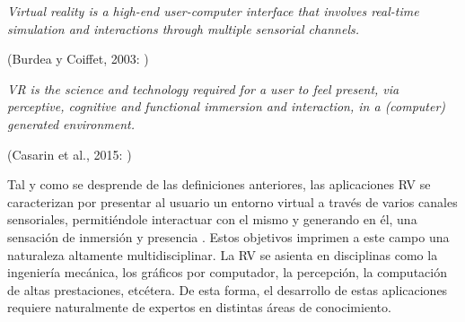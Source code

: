 \begin{center}
    \begin{minipage}{0.9\linewidth}
        {\small
\emph{Virtual reality is a high-end user-computer interface that
involves real-time simulation and interactions through
multiple sensorial channels.}
        }
        \begin{flushright}
            (Burdea y Coiffet, 2003: \cite{burdea2003virtual})
        \end{flushright}
    \end{minipage}
    
    \begin{minipage}{0.9\linewidth}
        {\small
\emph{VR is the science and technology required for a user
to feel present, via perceptive, cognitive and functional
immersion and interaction, in a (computer) generated
environment. }
        }
        \begin{flushright}
            (Casarin et al., 2015: \cite{kuntz2015middlevr})
        \end{flushright}
    \end{minipage}
    
\end{center}
%
Tal y como se desprende de las definiciones anteriores, las aplicaciones \ac{RV} se caracterizan por presentar al usuario un entorno virtual a través de varios canales sensoriales, permitiéndole interactuar con el mismo y generando en él, una sensación de inmersión y presencia \cite{Jerald:2015}. Estos objetivos imprimen a este campo una naturaleza altamente multidisciplinar. La \ac{RV} se asienta en disciplinas como la ingeniería mecánica, los gráficos por computador, la percepción, la computación de altas prestaciones, etcétera. De esta forma, el desarrollo de estas aplicaciones requiere naturalmente de expertos en distintas áreas de conocimiento.  

